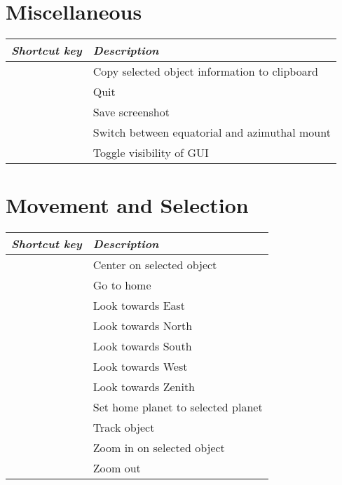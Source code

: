 \section{Miscellaneous}
\label{ch:Hotkeys:Miscellaneous}
\begin{longtabu}to \textwidth {cl}
\toprule
\emph{Shortcut key} & \emph{Description}\\\midrule
{}	 	& Copy selected object information to clipboard \\
	 	& Quit \\
	 	& Save screenshot \\
	 	& Switch between equatorial and azimuthal mount \\
	 	& Toggle visibility of GUI \\
\bottomrule
\end{longtabu}

\section{Movement and Selection}
\label{ch:Hotkeys:MovementSelection}
\begin{longtabu}to \textwidth {cl} 
\toprule
\emph{Shortcut key} 	& \emph{Description}\\\midrule
\key{\Space}			& Center on selected object \\
			& Go to home \\
			& Look towards East \\
			& Look towards North \\
			& Look towards South \\
			& Look towards West \\
			& Look towards Zenith \\
			& Set home planet to selected planet \\
					& Track object \\
\key{/}					& Zoom in on selected object \\
\key{\textbackslash{}}	& Zoom out \\
\bottomrule
\end{longtabu}


